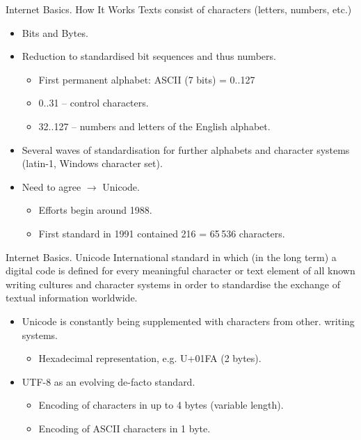 \documentclass{beamer}
\begin{document}
\begin{frame}{Internet Basics. How It Works}
Texts consist of characters (letters, numbers, etc.)
\begin{itemize}
\item Bits and Bytes.
\item Reduction to standardised bit sequences and thus numbers.
  \begin{itemize}
  \item First permanent alphabet: ASCII (7 bits) = 0..127
  \item 0..31 -- control characters.
  \item 32..127 -- numbers and letters of the English alphabet.
  \end{itemize}
\item Several waves of standardisation for further alphabets and character
  systems (latin-1, Windows character set).
\item Need to agree $\to$ Unicode.
  \begin{itemize}
  \item Efforts begin around 1988.
  \item First standard in 1991 contained 216 = 65\,536 characters.
  \end{itemize}
\end{itemize}
\end{frame}
\begin{frame}{Internet Basics. Unicode} 
International standard in which (in the long term) a digital code is defined
for every meaningful character or text element of all known writing cultures
and character systems in order to standardise the exchange of textual
information worldwide.

\begin{itemize}
\item Unicode is constantly being supplemented with characters from other.
  writing systems.
  \begin{itemize}
  \item Hexadecimal representation, e.g. U+01FA (2 bytes).
  \end{itemize}
\item UTF-8 as an evolving de-facto standard.
  \begin{itemize}
  \item Encoding of characters in up to 4 bytes (variable length).
  \item Encoding of ASCII characters in 1 byte.
  \end{itemize}
\end{itemize}
\end{frame}
\end{document}
